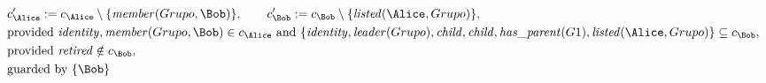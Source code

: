 \begin{align*}
&
c'_
{
\Alice
}
 := 
c_
{
\Alice
}
 \setminus 
\{
\mathit{\detokenize{
member
}}
(
Grupo
,
\Bob
)
\}
, \qquad 
c'_
{
\Bob
}
 := 
c_
{
\Bob
}
 \setminus 
\{
\mathit{\detokenize{
listed
}}
(
\Alice
,
Grupo
)
\}
,\\
&
\text{provided } 
\mathit{\detokenize{
identity
}}
,
\mathit{\detokenize{
member
}}
(
Grupo
,
\Bob
)
 \in c_
{
\Alice
}
 \text{ and } 
\{
\mathit{\detokenize{
identity
}}
,
\mathit{\detokenize{
leader
}}
(
Grupo
)
,
\mathit{\detokenize{
child
}}
,
\mathit{\detokenize{
child
}}
,
\mathit{\detokenize{
has_parent
}}
(
G1
)
,
\mathit{\detokenize{
listed
}}
(
\Alice
,
Grupo
)
\}
 \subseteq c_
{
\Bob
}
,\\
&
\text{provided } 
\mathit{\detokenize{
retired
}}
 \notin c_
{
\Bob
}
,\\
&
\text{guarded by } \{
\Bob
\}
\end{align*}

